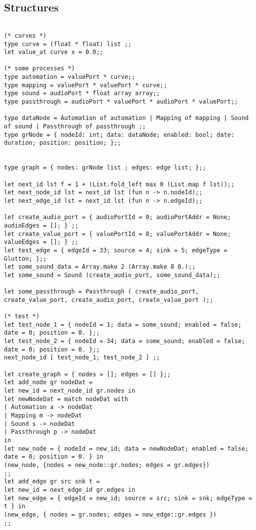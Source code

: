\documentclass[applsci,article,submit,moreauthors,pdftex,10pt,a4paper]{mdpi}
\begin{document}
\subsection{Structures}

\begin{lstlisting}

(* curves *)
type curve = (float * float) list ;;
let value_at curve x = 0.0;;

(* some processes *)
type automation = valuePort * curve;;
type mapping = valuePort * valuePort * curve;;
type sound = audioPort * float array array;;
type passthrough = audioPort * valuePort * audioPort * valuePort;;

type dataNode = Automation of automation | Mapping of mapping | Sound of sound | Passthrough of passthrough ;;
type grNode = { nodeId: int; data: dataNode; enabled: bool; date: duration; position: position; };;


type graph = { nodes: grNode list ; edges: edge list; };;

let next_id lst f = 1 + (List.fold_left max 0 (List.map f lst));;
let next_node_id lst = next_id lst (fun n -> n.nodeId);;
let next_edge_id lst = next_id lst (fun n -> n.edgeId);;

let create_audio_port = { audioPortId = 0; audioPortAddr = None; audioEdges = []; } ;;
let create_value_port = { valuePortId = 0; valuePortAddr = None; valueEdges = []; } ;;
let test_edge = { edgeId = 33; source = 4; sink = 5; edgeType = Glutton; };;
let some_sound_data = Array.make 2 (Array.make 8 0.);; 
let some_sound = Sound (create_audio_port, some_sound_data);;

let some_passthrough = Passthrough ( create_audio_port, create_value_port, create_audio_port, create_value_port );;

(* test *)
let test_node_1 = { nodeId = 1; data = some_sound; enabled = false; date = 0; position = 0. };;
let test_node_2 = { nodeId = 34; data = some_sound; enabled = false; date = 0; position = 0. };;
next_node_id [ test_node_1; test_node_2 ] ;;   

let create_graph = { nodes = []; edges = [] };;
let add_node gr nodeDat = 
let new_id = next_node_id gr.nodes in 
let newNodeDat = match nodeDat with 
| Automation a -> nodeDat
| Mapping m -> nodeDat
| Sound s -> nodeDat
| Passthrough p -> nodeDat
in
let new_node = { nodeId = new_id; data = newNodeDat; enabled = false; date = 0; position = 0. } in
(new_node, {nodes = new_node::gr.nodes; edges = gr.edges})
;;
let add_edge gr src snk t = 
let new_id = next_edge_id gr.edges in 
let new_edge = { edgeId = new_id; source = src; sink = snk; edgeType = t } in 
(new_edge, { nodes = gr.nodes; edges = new_edge::gr.edges })
;;


\end{lstlisting}
\end{document}
